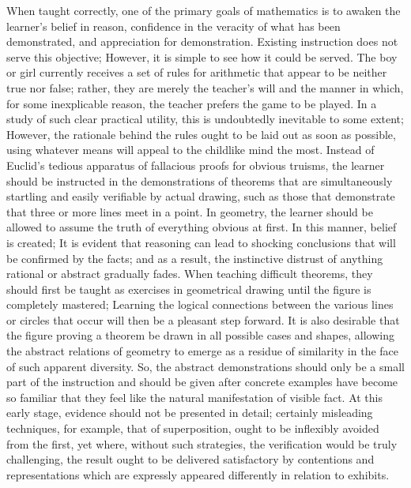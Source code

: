\documentclass[a4paper,12pt]{book}[2004/02/16]
\theoremstyle{ilemma}
\theoremstyle{itheorem}
\theoremstyle{iother}
\theoremstyle{icorollary}
\theoremstyle{numcorollary}
\theoremstyle{idefinition}
\begin{document}
When taught correctly, one of the primary goals of mathematics is to awaken the learner's belief in reason, confidence in the veracity of what has been demonstrated, and appreciation for demonstration. Existing instruction does not serve this objective; However, it is simple to see how it could be served. The boy or girl currently receives a set of rules for arithmetic that appear to be neither true nor false; rather, they are merely the teacher's will and the manner in which, for some inexplicable reason, the teacher prefers the game to be played. In a study of such clear practical utility, this is undoubtedly inevitable to some extent; However, the rationale behind the rules ought to be laid out as soon as possible, using whatever means will appeal to the childlike mind the most. Instead of Euclid's tedious apparatus of fallacious proofs for obvious truisms, the learner should be instructed in the demonstrations of theorems that are simultaneously startling and easily verifiable by actual drawing, such as those that demonstrate that three or more lines meet in a point. In geometry, the learner should be allowed to assume the truth of everything obvious at first. In this manner, belief is created; It is evident that reasoning can lead to shocking conclusions that will be confirmed by the facts; and as a result, the instinctive distrust of anything rational or abstract gradually fades. When teaching difficult theorems, they should first be taught as exercises in geometrical drawing until the figure is completely mastered; Learning the logical connections between the various lines or circles that occur will then be a pleasant step forward. It is also desirable that the figure proving a theorem be drawn in all possible cases and shapes, allowing the abstract relations of geometry to emerge as a residue of similarity in the face of such apparent diversity. So, the abstract demonstrations should only be a small part of the instruction and should be given after concrete examples have become so familiar that they feel like the natural manifestation of visible fact. At this early stage, evidence should not be presented in detail; certainly misleading techniques, for example,
that of superposition, ought to be inflexibly avoided from the first, yet
where, without such strategies, the verification would be truly challenging, the
result ought to be delivered satisfactory by contentions and representations
which are expressly appeared differently in relation to exhibits.
\end{document}
